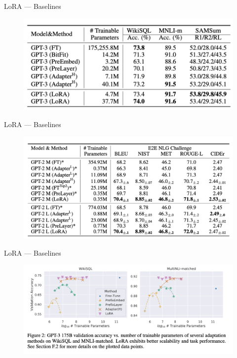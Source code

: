 \documentclass[aspectratio=169,xcolor=dvipsnames]{beamer}
\begin{document}
\begin{frame}{LoRA --- Baselines}
    \begin{figure}
        \centering
        \label{gpt2_fintune}
        \includegraphics[width=0.8 \linewidth]{figures/gpt2_fintune.png}
    \end{figure}  
\end{frame}


\begin{frame}{LoRA --- Baselines}
    \begin{figure}
        \centering
        \label{gpt3_finetune}
        \includegraphics[width=0.8 \linewidth]{figures/gpt3_finetune.png}
    \end{figure}  
\end{frame}


\begin{frame}{LoRA --- Baselines}
    \begin{figure}
        \centering
        \label{gpt3_performance_parameters}
        \includegraphics[width=0.8 \linewidth]{figures/gpt3_performance_parameters.png}
    \end{figure}  
\end{frame}
\end{document}
